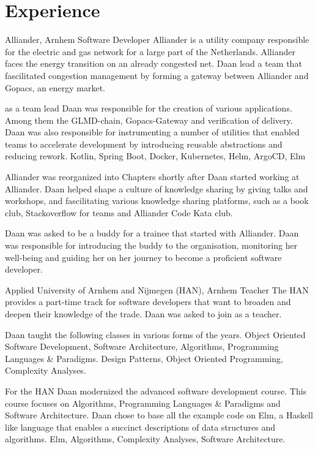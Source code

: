 \section*{Experience}
  \begin{workExperience}{Alliander, Arnhem}%
  {Software Developer}{}
        Alliander is a utility company responsible for the electric and gas network for a large part of the Netherlands.
        Alliander faces the energy transition on an already congested net. Daan lead a team that fascilitated congestion
        management by forming a gateway between Alliander and Gopacs, an energy market.
        
         as a team lead Daan was responsible for the creation of various applications.
        Among them the GLMD-chain, Gopacs-Gateway and verification of delivery.
        Daan was also responsible for instrumenting a number of utilities that enabled teams to accelerate development
        by introducing reusable abstractions and reducing rework.
        \technics Kotlin, Spring Boot, Docker, Kubernetes, Helm, ArgoCD, Elm
        
         Alliander was reorganized into Chapters shortly after Daan started working at Alliander.
        Daan helped shape a culture of knowledge sharing by giving talks and workshops, and fascilitating various knowledge sharing
        platforms, such as a book club, Stackoverflow for teams and Alliander Code Kata club.

         Daan was asked to be a buddy for a trainee that started with Alliander.
        Daan was responsible for introducing the buddy to the organisation, monitoring her well-being and guiding her on her journey
        to become a proficient software developer.
  \end{workExperience}

  \begin{workExperience}{Applied University of Arnhem and Nijmegen (HAN), Arnhem}%
  {Teacher}{}
  The HAN provides a part-time track for software developers that want to
  broaden and deepen their knowledge of the trade. Daan was asked to join as a
  teacher. 

  Daan taught the following classes in various forms of the years. Object
  Oriented Software Development, Software Architecture, Algorithms, Programming
  Languages \& Paradigms.
  \technics Design Patterns, Object Oriented Programming, Complexity Analyses.

  For the HAN Daan modernized the advanced software development course. This
  course focuses on Algorithms, Programming Languages \& Paradigms and Software
  Architecture.
  Daan chose to base all the example code on Elm, a Haskell like language that
  enables a succinct descriptions of data structures and algorithms.
  \technics Elm, Algorithms, Complexity Analyses, Software Architecture.

  \end{workExperience}

